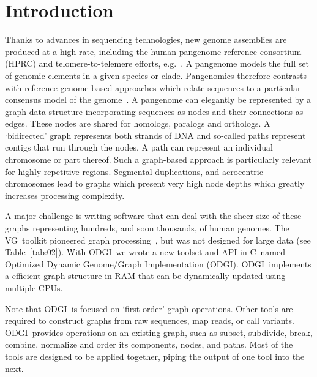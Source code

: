 \documentclass{bioinfo}
\newcommand{\odgi}{ODGI}
\newcommand{\vg}{VG}
\newcommand{\Rplus}{\protect\hspace{-.1em}\protect\raisebox{.35ex}{\smaller{\smaller\textbf{+}}}}
\newcommand{\Cpp}{\mbox{C\Rplus\Rplus}\xspace}
\begin{document}
    \maketitle


    \section{Introduction}

    Thanks to advances in sequencing technologies, new genome
    assemblies are produced at a high rate, including the human
    pangenome reference consortium (HPRC) and telomere-to-telemere
    efforts, e.g.~\citep{Miga:2020}.  A pangenome models the full set
    of genomic elements in a given species or clade. Pangenomics
    therefore contrasts with reference genome based approaches which
    relate sequences to a particular consensus model of the
    genome~\citep{Eizenga:2020}. A pangenome can elegantly be
    represented by a graph data structure incorporating sequences as
    nodes and their connections as edges. These nodes are shared for
    homologs, paralogs and orthologs.  A `bidirected' graph represents
    both strands of DNA and so-called paths represent contigs that run
    through the nodes. A path can represent an individual chromosome
    or part thereof. Such a graph-based approach is particularly
    relevant for highly repetitive regions. Segmental duplications,
    and acrocentric chromosomes lead to graphs which present very high
    node depths which greatly increases processing complexity.

    A major challenge is writing software that can deal with the sheer
    size of these graphs representing hundreds, and soon thousands, of
    human genomes. The \vg\ toolkit pioneered graph
    processing~\citep{vgtools,Eizenga:2020b}, but was not designed for
    large data (see Table~\ref{tab:02}). With \odgi\ we
    wrote a new toolset and API in \Cpp\ named Optimized Dynamic
    Genome/Graph Implementation (ODGI). \odgi\ implements a efficient
    graph structure in RAM that can be dynamically updated using
    multiple CPUs.

    Note that \odgi\ is focused on `first-order' graph
    operations.  Other tools are required to construct graphs from raw
    sequences, map reads, or call variants.  \odgi\ provides
    operations on an existing graph, such as subset, subdivide, break,
    combine, normalize and order its components, nodes, and
    paths. Most of the tools are designed to be applied together,
    piping the output of one tool into the next.
\end{document}
